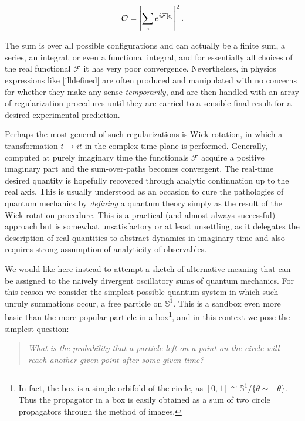 \documentclass{article}
\begin{document}
\begin{equation}\label{illdefined}
    \mathcal{O} = \abs{ \sum_{c} e^{i\mathcal{F}[c]} }^2\,.
\end{equation}

The sum is over all possible configurations and can actually be a finite sum, a series, an integral, or even a functional integral, and for essentially all choices of the real functional $\mathcal{F}$ it has very poor convergence. Nevertheless, in physics expressions like \eqref{illdefined} are often produced and manipulated with no concerns for whether they make any sense \emph{temporarily}, and are then handled with an array of regularization procedures until they are carried to a sensible final result for a desired experimental prediction.

Perhaps the most general of such regularizations is Wick rotation, in which a transformation $t \rightarrow it$ in the complex time plane is performed. Generally, computed at purely imaginary time the functionals $\mathcal{F}$ acquire a positive imaginary part and the sum-over-paths becomes convergent. The real-time desired quantity is hopefully recovered through analytic continuation up to the real axis. This is usually understood as an occasion to cure the pathologies of quantum mechanics by \emph{defining} a quantum theory simply as the result of the Wick rotation procedure. This is a practical (and almost always successful) approach but is somewhat unsatisfactory or at least unsettling, as it delegates the description of real quantities to abstract dynamics in imaginary time and also requires strong assumption of analyticity of observables.

We would like here instead to attempt a sketch of alternative meaning that can be assigned to the naively divergent oscillatory sums of quantum mechanics. For this reason we consider the simplest possible quantum system in which such unruly summations occur, a free particle on $\mathbb{S}^1$. This is a sandbox even more basic than the more popular particle in a box\footnote{In fact, the box is a simple orbifold of the circle, as $[0,1] \cong \mathbb{S}^1/\{\theta \sim - \theta\}$. Thus the propagator in a box is easily obtained as a sum of two circle propagators through the method of images.}, and in this context we pose the simplest question:

\begin{quote} \emph{What is the probability that a particle left on a point on the circle will reach another given point after some given time?} \end{quote}
\end{document}
